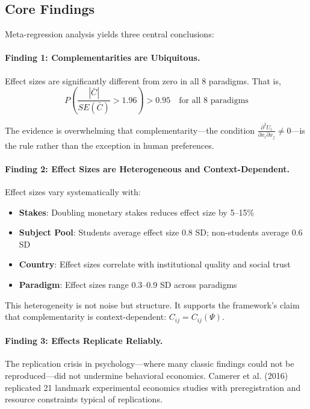 \documentclass[12pt,oneside]{book}
\begin{document}
\subsection{Core Findings}

Meta-regression analysis yields three central conclusions:

\paragraph{Finding 1: Complementarities are Ubiquitous.}

Effect sizes are significantly different from zero in all 8 paradigms. That is,
\begin{equation}
P\left(\frac{|\bar{C}|}{SE(\bar{C})} > 1.96\right) > 0.95 \quad \text{for all 8 paradigms}
\end{equation}

The evidence is overwhelming that complementarity—the condition $\frac{\partial^2 U_i}{\partial x_i \partial x_j} \neq 0$—is
the rule rather than the exception in human preferences.

\paragraph{Finding 2: Effect Sizes are Heterogeneous and Context-Dependent.}

Effect sizes vary systematically with:
\begin{itemize}
  \item \textbf{Stakes}: Doubling monetary stakes reduces effect size by 5--15\%
  \item \textbf{Subject Pool}: Students average effect size 0.8 SD; non-students average 0.6 SD
  \item \textbf{Country}: Effect sizes correlate with institutional quality and social trust
  \item \textbf{Paradigm}: Effect sizes range 0.3--0.9 SD across paradigms
\end{itemize}

This heterogeneity is not noise but structure. It supports the framework's claim that
complementarity is context-dependent: $C_{ij} = C_{ij}(\Psi)$.

\paragraph{Finding 3: Effects Replicate Reliably.}

The replication crisis in psychology—where many classic findings could not be reproduced—did not
undermine behavioral economics. Camerer et al. (2016) replicated 21 landmark experimental economics
studies with preregistration and resource constraints typical of replications.
\end{document}

